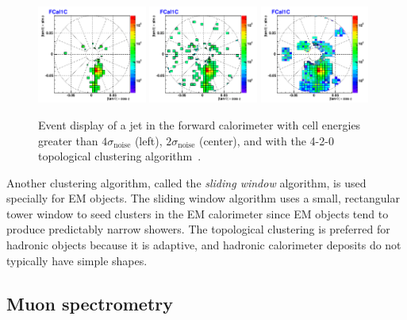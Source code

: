 \begin{figure}[tp]
  \centering
  \includegraphics[width=0.32\textwidth]{figures/lhc-atlas/FCal1C_JF50_28_4sigma}
  \includegraphics[width=0.32\textwidth]{figures/lhc-atlas/FCal1C_JF50_28_2sigma}
  \includegraphics[width=0.32\textwidth]{figures/lhc-atlas/FCal1C_JF50_28}
  \caption{Event display of a jet in the forward calorimeter with cell energies greater than $4\sigma_\text{noise}$ (left), $2\sigma_\text{noise}$ (center), and with the \textsc{4-2-0} topological clustering algorithm~\cite{ATL-SLIDE-2007-027}.}
  \label{fig:atlas-detector-clustering}
\end{figure}

Another clustering algorithm, called the \textit{sliding window} algorithm, is used specially for EM objects. The sliding window algorithm uses a small, rectangular tower window to seed clusters in the EM calorimeter since EM objects tend to produce predictably narrow showers. The topological clustering is preferred for hadronic objects because it is adaptive, and hadronic calorimeter deposits do not typically have simple shapes.

\subsection{Muon spectrometry}

